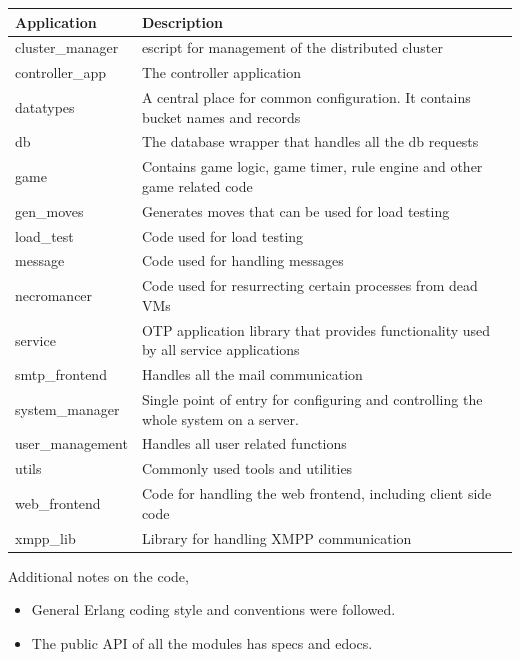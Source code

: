 \documentclass[11pt,a4paper]{report}
\begin{document}
\begin{center}
    \begin{tabular}{ | l | p{10cm} |}
    \hline
    Application & Description \\ \hline \hline
    cluster\_manager & escript for management of the distributed
    cluster \\ \hline
    controller\_app & The controller application \\ \hline
    datatypes & A central place for common configuration. It contains bucket
    names and records \\ \hline
    db & The database wrapper that handles all the db requests\\ \hline
    game & Contains game logic, game timer, rule engine and other game
    related code \\ \hline
    gen\_moves & Generates moves that can be used for load testing \\ \hline
    load\_test & Code used for load testing \\ \hline
    message & Code used for handling messages \\ \hline
    necromancer & Code used for resurrecting certain processes from dead VMs \\ \hline
    service &  OTP application library that provides functionality used by
    all service applications \\ \hline
    smtp\_frontend & Handles all the mail communication \\ \hline
    system\_manager & Single point of entry for configuring and controlling
    the whole system on a server. \\ \hline
    user\_management & Handles all user related functions \\ \hline
    utils & Commonly used tools and utilities \\ \hline
    web\_frontend & Code for handling the web frontend, including client
    side code \\ \hline
    xmpp\_lib & Library for handling XMPP communication \\ \hline \hline
    \end{tabular}
\end{center}



Additional notes on the code,

\begin{itemize}
\item General Erlang coding style and conventions were followed.
\item The public API of all the modules has specs and edocs.
\end{itemize}
\end{document}

